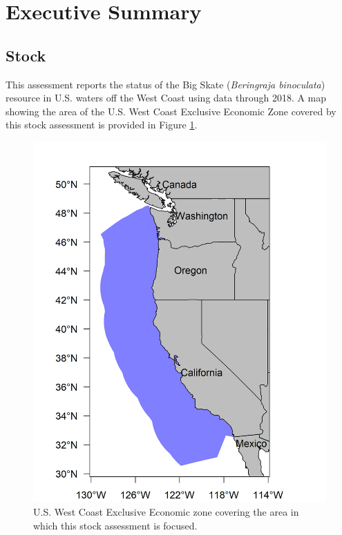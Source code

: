\documentclass[12pt,]{article}
\begin{document}
{
\setcounter{tocdepth}{4}
\tableofcontents
}
\setlength{\parskip}{5mm plus1mm minus1mm}
\pagebreak


\renewcommand{\thefigure}{\alph{figure}}
\renewcommand{\thetable}{\alph{table}}

\hypertarget{executive-summary}{%
\section*{Executive Summary}\label{executive-summary}}

\hypertarget{stock}{%
\subsection*{Stock}\label{stock}}

This assessment reports the status of the Big Skate
(\emph{Beringraja binoculata}) resource in U.S. waters off the West
Coast using data through 2018. A map showing the area of the U.S. West
Coast Exclusive Economic Zone covered by this stock assessment is
provided in Figure \ref{fig:assess_region_map}.

\begin{figure}[H]
\begin{centering}
\includegraphics{Figures/assess_region_map.png}
\caption{U.S. West Coast Exclusive Economic zone covering the area in which this stock assessment is focused.}\label{fig:assess_region_map}
\end{centering}
\end{figure}
\end{document}
